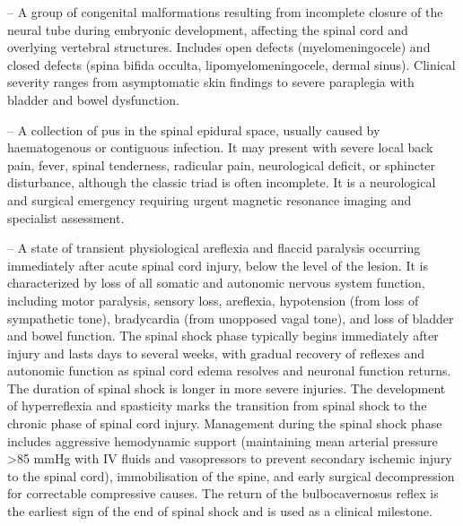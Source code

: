 -- A group of congenital malformations resulting from incomplete closure of the neural tube during embryonic development, affecting the spinal cord and overlying vertebral structures. Includes open defects (myelomeningocele) and closed defects (spina bifida occulta, lipomyelomeningocele, dermal sinus). Clinical severity ranges from asymptomatic skin findings to severe paraplegia with bladder and bowel dysfunction.

-- A collection of pus in the spinal epidural space, usually caused by haematogenous or contiguous infection. It may present with severe local back pain, fever, spinal tenderness, radicular pain, neurological deficit, or sphincter disturbance, although the classic triad is often incomplete. It is a neurological and surgical emergency requiring urgent magnetic resonance imaging and specialist assessment.

-- A state of transient physiological areflexia and flaccid paralysis occurring immediately after acute spinal cord injury, below the level of the lesion. It is characterized by loss of all somatic and autonomic nervous system function, including motor paralysis, sensory loss, areflexia, hypotension (from loss of sympathetic tone), bradycardia (from unopposed vagal tone), and loss of bladder and bowel function. The spinal shock phase typically begins immediately after injury and lasts days to several weeks, with gradual recovery of reflexes and autonomic function as spinal cord edema resolves and neuronal function returns. The duration of spinal shock is longer in more severe injuries. The development of hyperreflexia and spasticity marks the transition from spinal shock to the chronic phase of spinal cord injury. Management during the spinal shock phase includes aggressive hemodynamic support (maintaining mean arterial pressure >85 mmHg with IV fluids and vasopressors to prevent secondary ischemic injury to the spinal cord), immobilisation of the spine, and early surgical decompression for correctable compressive causes. The return of the bulbocavernosus reflex is the earliest sign of the end of spinal shock and is used as a clinical milestone.

